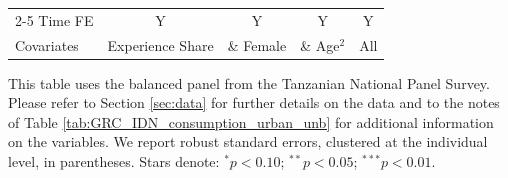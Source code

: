 \begin{table}[htbp]
\begin{threeparttable}
\begin{tabular}{l cccc}
\cmidrule{2-5} Time FE & Y & Y & Y & Y \\ Covariates & Experience Share & \& Female & \& Age$^2$ & All \\ \bottomrule \end{tabular} \begin{tablenotes}[flushleft] \footnotesize \item{This table uses the balanced panel from the Tanzanian National Panel Survey. Please refer to Section \ref{sec:data} for further details on the data and to the notes of Table \ref{tab:GRC_IDN_consumption_urban_unb} for additional information on the variables. We report robust standard errors, clustered at the individual level, in parentheses. Stars denote: $^{*} p<0.10$; $^{**} p<0.05$; $^{***} p<0.01$.} \end{tablenotes} \end{threeparttable} \end{table}
